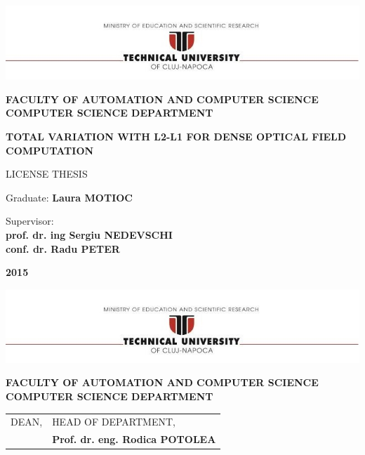 \documentclass[12pt,a4paper,twoside]{report}
\renewcommand{\thesisauthor}{Laura MOTIOC}    %
\renewcommand{\thesisyear}{2015}      %
\renewcommand{\thesistitle}{TOTAL VARIATION WITH L2-L1 FOR DENSE OPTICAL FIELD COMPUTATION}
\renewcommand{\thesissupervisor}{\\ prof. dr. ing Sergiu NEDEVSCHI \\conf. dr. Radu PETER }
\newcommand{\department}{\bf FACULTY OF AUTOMATION AND COMPUTER SCIENCE\\
COMPUTER SCIENCE DEPARTMENT}
\newcommand{\utcnlogo}{\includegraphics[width=15cm]{img/tucn.jpg}}
\begin{document}

\newenvironment{definition}[1][Defini\c{t}ie.]{\begin{trivlist}
\item[\hskip \labelsep {\bfseries #1}]}{\end{trivlist}}




\setcounter{page}{4}



\begin{center}
\utcnlogo

\department

\vspace{3cm}

{\bf \thesistitle} %

\vspace{1.5cm}

LICENSE THESIS

\vspace{5.5cm}

Graduate: {\bf \thesisauthor} 

Supervisor: {\bf \thesissupervisor}

\vspace{3cm}
{\bf \thesisyear}
\end{center}

\thispagestyle{empty}
\newpage

\begin{center}
\utcnlogo

\department

\end{center}
\vspace{0.5cm}

\begin{tabular}{p{7cm}p{8cm}}
 \hspace{-1cm}DEAN, & HEAD OF DEPARTMENT,\\
\hspace{-1cm}{\bf Prof. dr. eng. Liviu MICLEA} & {\bf Prof. dr. eng. Rodica POTOLEA}\\  
\end{tabular}
 
\end{document}
